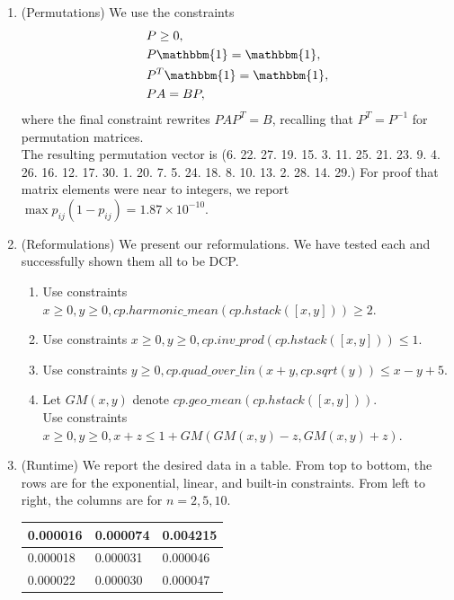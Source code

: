 \documentclass{article}
\begin{document}
\begin{enumerate}
    \item (Permutations) We use the constraints \begin{align*}
    	&P \geq 0, \\
    	&P \mathbbm{1} = \mathbbm{1}, \\
    	&P^T \mathbbm{1} = \mathbbm{1}, \\
    	&P A = B P,
    \end{align*} where the final constraint rewrites $PAP^T = B$, recalling that $P^T = P^{-1}$ for permutation matrices. \\

	The resulting permutation vector is (6. 22. 27. 19. 15.  3. 11. 25. 21. 23.  9.  4. 26. 16. 12. 17. 30.  1. 20.  7.  5. 24. 18.  8. 10. 13.  2. 28. 14. 29.) For proof that matrix elements were near to integers, we report $\max p_{ij}(1 - p_{ij}) = 1.87 \times 10^{-10}$.
    
    \item (Reformulations) We present our reformulations. We have tested each and successfully shown them all to be DCP. \begin{enumerate}
    	\item Use constraints $x \geq 0, y \geq 0, cp.harmonic\_mean(cp.hstack([x, y])) \geq 2$.
    	\item Use constraints $x \geq 0, y \geq 0, cp.inv\_prod(cp.hstack([x, y])) \leq 1$.
    	\item Use constraints $y \geq 0, cp.quad\_over\_lin(x + y, cp.sqrt(y)) \leq x - y + 5$.
    	\item Let $GM(x, y)$ denote $cp.geo\_mean(cp.hstack([x, y]))$. \\
    	Use constraints $x \geq 0, y \geq 0, x + z \leq 1 + GM(GM(x, y) - z, GM(x, y) + z)$.
   	\end{enumerate}
   
   \item (Runtime) We report the desired data in a table. From top to bottom, the rows are for the exponential, linear, and built-in constraints. From left to right, the columns are for $n = 2, 5, 10$.
   \begin{center}
   	\begin{tabular}{ | m{1.5cm} | m{1.5cm}| m{1.5cm} | } 
   		\hline
   		0.000016 & 0.000074 & 0.004215 \\ 
   		\hline
   		0.000018 & 0.000031 & 0.000046 \\ 
   		\hline
   		0.000022 & 0.000030 & 0.000047 \\ 
   		\hline
   	\end{tabular}
   \end{center}
    
\end{enumerate}
\end{document}

